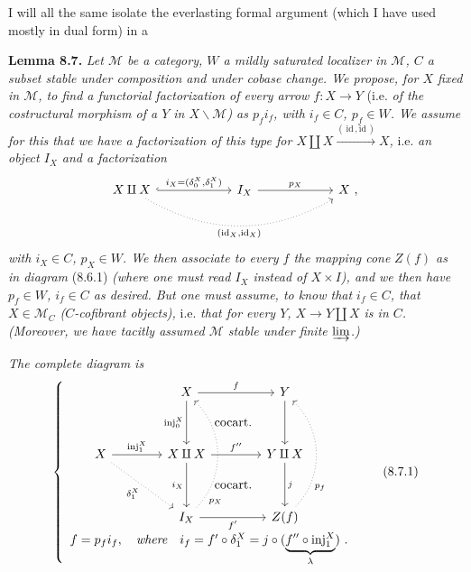 I will all the same isolate the everlasting formal argument (which I have used mostly in dual form) in a

\textbf{Lemma 8.7.} \textit{Let $\mathcal{M}$ be a category, $W$ a mildly saturated localizer in $\mathcal{M}$, $C$ a subset stable under composition and under cobase change. We propose, for $X$ fixed in $\mathcal{M}$, to find a functorial factorization of every arrow $f : X \longrightarrow Y$} (i.e. \textit{of the costructural morphism of a $Y$ in $X\backslash\mathcal{M}$) as $p_f i_f$, with $i_f \in C$, $p_f \in W$. We assume for this that we have}
\textit{a factorization of this type for $X \amalg X \xrightarrow{(\,\mathrm{id}\,,\mathrm{id}\,)} X$,} i.e. \textit{an object $I_X$ and a factorization}
\[
\begin{tikzcd}[column sep=6em]
X \amalg X \arrow[r, hook, "{i_X = (\delta_0^X,\delta_1^X)}"] \arrow[rr, dotted, bend right, "{(\mathrm{id}_X,\mathrm{id}_X)}"'] & I_X \arrow[r, "p_X"] & X\ ,
\end{tikzcd}
\]
\textit{with $i_X \in C$, $p_X \in W$. We then associate to every $f$ the mapping cone} \textit{$Z(f)$ as in diagram} (8.6.1) \textit{(where one must read $I_X$ instead of $X \times I$), and we then have $p_f \in W$, $i_f \in C$ as desired. But one must assume, to know that $i_f \in C$, that $X \in \mathcal{M}_C$ ($C$-cofibrant objects),} i.e. \textit{that for every $Y$, $X \longrightarrow Y \amalg X$ is in $C$. (Moreover, we have tacitly assumed $\mathcal{M}$ stable under finite $\varinjlim$.)}


\textit{The complete diagram is}
\[
\left\{
\begin{array}{c}
\begin{tikzcd}[ampersand replacement=\&,column sep=4em,row sep=3.5em]
 \& X \arrow[r, "f"] \arrow[d, "\mathrm{inj}_0^X"'] \arrow[dr, phantom, "\text{cocart.}"] \& Y \arrow[d] \\
X \arrow[r, "\mathrm{inj}_1^X"] \arrow[dr, dotted, "\delta_1^X"'] \& X \amalg X \arrow[r, "f''"] \arrow[d, "i_X"'] \arrow[dr, phantom, "\text{cocart.}"] \& Y \amalg X \arrow[d, "j"] \\
 \& I_X \arrow[r, "f'"'] \arrow[uu, dotted, bend right=45, "p_X"{pos=.12,swap}] \& Z(f) \arrow[uu, dotted, bend right=45, "p_f"{pos=.25,swap}]
\end{tikzcd}
\\[1ex]
f = p_f i_f, \quad \textit{where} \quad i_f = f' \circ \delta_1^X = j \circ (\underbrace{f'' \circ \mathrm{inj}_1^X}_{\lambda})\ .
\end{array}
\right.
\tag*{(8.7.1)}
\]

